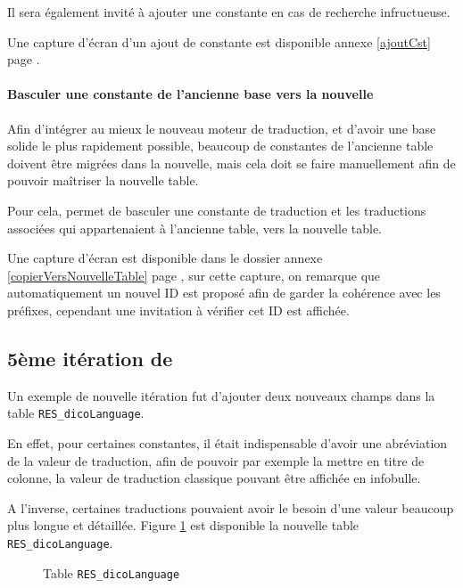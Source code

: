             Il sera également invité à ajouter une constante en cas de recherche infructueuse.

        Une capture d'écran d'un ajout de constante est disponible annexe \ref{ajoutCst} page \pageref{ajoutCst}.
        \paragraph{Basculer une constante de l'ancienne base vers la nouvelle}
            Afin d'intégrer au mieux le nouveau moteur de traduction, et d'avoir une base solide le plus rapidement possible, beaucoup de constantes de l'ancienne table doivent être migrées dans la nouvelle, mais cela doit se faire manuellement afin de pouvoir maîtriser la nouvelle table.

            Pour cela, \mlanguage{} permet de basculer une constante de traduction et les traductions associées qui appartenaient à l'ancienne table, vers la nouvelle table.

        Une capture d'écran est disponible dans le dossier annexe \ref{copierVersNouvelleTable} page \pageref{copierVersNouvelleTable}, sur cette capture, on remarque que automatiquement un nouvel ID est proposé afin de garder la cohérence avec les préfixes, cependant une invitation à vérifier cet ID est affichée.

	\subsection{5ème itération de \mlanguage{}}\label{iteration}
        Un exemple de nouvelle itération fut d'ajouter deux nouveaux champs dans la table \texttt{RES\_dicoLanguage}.

		En effet, pour certaines constantes, il était indispensable d'avoir une abréviation de la valeur de traduction, afin de pouvoir par exemple la mettre en titre de colonne, la valeur de traduction classique pouvant être affichée en infobulle.
		
		A l'inverse, certaines traductions pouvaient avoir le besoin d'une valeur beaucoup plus longue et détaillée.
\newpage
Figure \ref{fig:nouvelleNouvelletable} est disponible la nouvelle table \texttt{RES\_dicoLanguage}.
\begin{figure}[H]
    \centering
	
    \vspace{-5px}
	\caption{Table \texttt{RES\_dicoLanguage}}
    \label{fig:nouvelleNouvelletable}
\end{figure}

